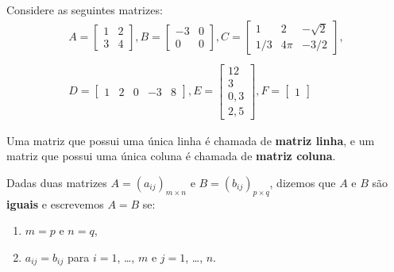 \documentclass{beamer}
\begin{document}
    \begin{frame}
      \begin{exemplos}
        Considere as seguintes matrizes:
        \begin{align*}
          A = \begin{bmatrix}
            1 & 2\\
            3 & 4
          \end{bmatrix},
          B = \begin{bmatrix}
            -3 & 0\\
            0 & 0
          \end{bmatrix},
          C = \begin{bmatrix}
            1 & 2 & -\sqrt{2}\\
            1/3 & 4\pi & -3/2
          \end{bmatrix},\\\\
          D = \begin{bmatrix}
            1 & 2 & 0 & -3 & 8
          \end{bmatrix},
          E = \begin{bmatrix}
            12\\
            3\\
            0,3\\
            2,5
          \end{bmatrix},
          F = \begin{bmatrix}
            1
          \end{bmatrix}
        \end{align*} 
      \end{exemplos}
    \end{frame}

    \begin{frame}
    \begin{definicao}
      Uma matriz que possui uma única linha é chamada de \textbf{matriz linha}, e um matriz que possui uma única coluna
      é chamada de \textbf{matriz coluna}.
    \end{definicao}

    \begin{definicao}
      Dadas duas matrizes $A = (a_{ij})_{m \times n}$ e $B = (b_{ij})_{p \times q}$, dizemos que $A$ e $B$ são \textbf{iguais}
      e escrevemos $A = B$ se:
      \begin{enumerate}[label={\arabic*})]
        \item $m = p$ e $n = q$,
        \item $a_{ij} = b_{ij}$ para $i = 1$, \dots, $m$ e $j = 1$, \dots, $n$.
      \end{enumerate}
    \end{definicao}
  \end{frame}
  
\end{document}
